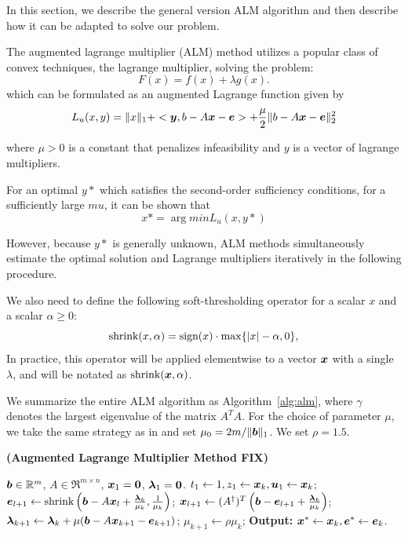 \documentclass[10pt,twocolumn,letterpaper]{article}
\begin{document}
In this section, we describe the general version ALM algorithm and then describe how it can be adapted to solve our problem.

The augmented lagrange multiplier (ALM) method utilizes a popular class of convex techniques, the lagrange multiplier, solving the problem:
\begin{equation}
F(x) = f(x) + \lambda g(x).
\end{equation}
which can be formulated as an augmented Lagrange function given by
\begin{equation}
L_u(x,y) = \|x\|_1 + <\boldsymbol{y}, b - A{\boldsymbol{x}} - \boldsymbol{e}> + \frac{\mu}2 \| b-A{\boldsymbol{x}}-\boldsymbol{e} \|_2^2
\end{equation}

where $\mu > 0$ is a constant that penalizes infeasibility and $y$ is a vector of lagrange multipliers.

For an optimal $y*$ which satisfies the second-order sufficiency conditions, for a sufficiently large $mu$, it can be shown that
\begin{equation}
x* = \arg min L_u(x,y*)
\end{equation}

However, because $y*$ is generally unknown, ALM methods simultaneously estimate the optimal solution and Lagrange multipliers iteratively in the following procedure.

We also need to define the following soft-thresholding operator for a
scalar $x$ and a scalar $\alpha \geq 0$:
\begin{equation}
\textup{shrink}(x,\alpha) = \textup{sign}(x)\cdot \max \{|x| - \alpha, 0\},
\end{equation}
In practice, this operator will be applied elementwise to a vector ${\boldsymbol{x}}$ with a single $\lambda$,
and will be notated as $\textup{shrink}({\boldsymbol{x}},\alpha)$.

We summarize the entire ALM
algorithm as Algorithm~\ref{alg:alm}, where $\gamma$ denotes the largest eigenvalue of the matrix $A^TA$. For the choice of parameter $\mu$, we take the same strategy as
in \cite{YangJ2009-pp} and set $\mu_0 = 2m / \|{\boldsymbol{b}}\|_1$. We set $\rho=1.5$.
\begin{algorithm}[h]
\caption{\bf (Augmented Lagrange Multiplier Method FIX)}
\begin{algorithmic}[1]
 ${\boldsymbol{b}} \in {\mathbb{R}}^m$, $A \in \Re^{m \times n}$,
${\boldsymbol{x}}_1 = \boldsymbol{0}$, $\boldsymbol{\lambda}_1 = \boldsymbol{0}$.
\STATE $t_{1} \leftarrow 1, z_{1} \leftarrow {\boldsymbol{x}}_{k}, \boldsymbol{u}_{1} \leftarrow {\boldsymbol{x}}_{k}$;
\STATE $\boldsymbol{e}_{l+1} \leftarrow \textup{shrink}\left({\boldsymbol{b}} - A{\boldsymbol{x}}_l + \frac{\boldsymbol{\lambda}_k}{\mu_k}, \frac{1}{\mu_k}\right)$;
\STATE ${\boldsymbol{x}}_{l+1} \leftarrow (A^\dagger)^T \left({\boldsymbol{b}} - \boldsymbol{e}_{l+1} + \frac{\boldsymbol{\lambda}_k}{\mu_k} \right) $;
\ENDWHILE
\STATE $\boldsymbol{\lambda}_{k+1} \leftarrow \boldsymbol{\lambda}_k + \mu ({\boldsymbol{b}} - A{\boldsymbol{x}}_{k+1} - \boldsymbol{e}_{k+1})$;
\STATE $\mu_{k+1} \leftarrow \rho\mu_k$;
\ENDWHILE \STATE
{\bf Output:} ${\boldsymbol{x}}^* \leftarrow {\boldsymbol{x}}_k, \boldsymbol{e}^* \leftarrow \boldsymbol{e}_k$.
\end{algorithmic}
\label{alg:alm}
\end{algorithm}
\end{document}
